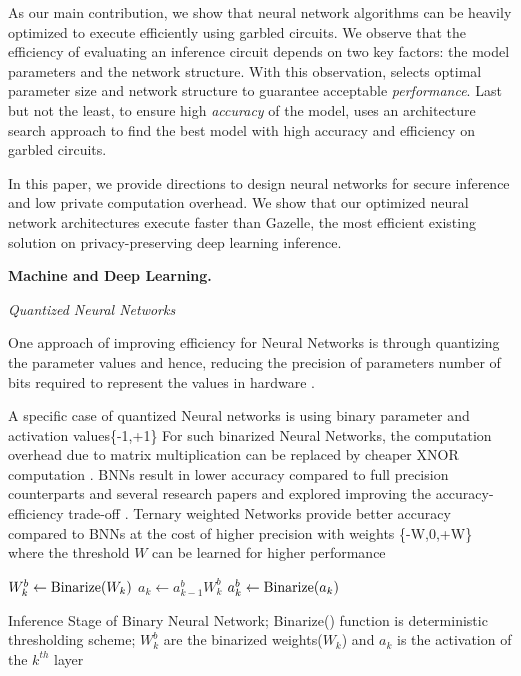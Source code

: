 As our main contribution, we show that neural network algorithms can be heavily optimized to execute efficiently using garbled circuits. We observe that the efficiency of evaluating an inference circuit depends on two key factors: the model parameters and the network structure.  With this observation,  selects optimal parameter size and network structure to guarantee acceptable {\em performance}. Last but not the least, to ensure high {\em accuracy} of the model,  uses an architecture search approach to find the best model with high accuracy and efficiency on garbled circuits.

In this paper, we provide directions to design neural networks for secure inference and low private computation overhead. We show that our optimized neural network architectures execute faster than Gazelle, the most efficient existing solution on privacy-preserving deep learning inference.




\textbf{Machine and Deep Learning.}

\textit{Quantized Neural Networks}

One approach of improving efficiency for Neural Networks is through quantizing the parameter values and hence, reducing the precision of parameters number of bits required to represent the values in hardware \cite{Hubara:2017:QNN:3122009.3242044}.

A specific case of quantized Neural networks is using binary parameter and activation values\{-1,+1\} \cite{NIPS2016_6573}\cite{NIPS2015_5647}
For such binarized Neural Networks, the computation overhead due to matrix multiplication can be replaced by cheaper XNOR computation \cite{rastegari2016xnornet}\cite{DBLP:journals/corr/ZhouNZWWZ16}.
BNNs result in lower accuracy compared to full precision counterparts and several research papers and explored improving the accuracy-efficiency trade-off \cite{AAAI1714619}.
Ternary weighted Networks provide better accuracy compared to BNNs at the cost of higher precision with weights \{-W,0,+W\} where the threshold $W$ can be learned for higher performance \cite{DBLP:journals/corr/ZhuHMD16}\cite{Li2016TernaryWN}

\begin{algorithm}
\begin{algorithmic}
        \STATE $W_k^b \leftarrow {\rm Binarize}(W_k)$
        \STATE $a_k \leftarrow a_{k-1}^b W_k^b$
            \STATE $a_k^b \leftarrow {\rm Binarize}(a_k)$
        \ENDIF
    \ENDFOR

\end{algorithmic}
\caption{
Inference Stage of Binary Neural Network; Binarize() function is deterministic thresholding scheme; $W_k^b$ are the binarized weights($W_k$) and $a_k$ is the activation of the $k^{th}$ layer
}
\label{alg:train}
\end{algorithm}


